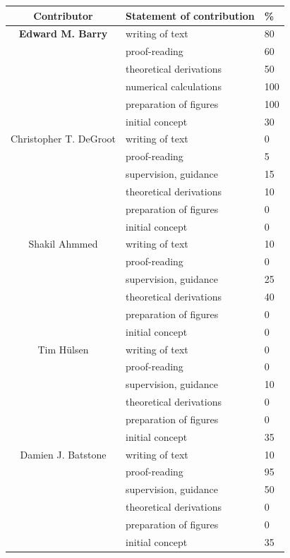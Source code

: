 \cleartoevenpage
\pagestyle{empty}	%


\begin{table}[h]
	\begin{center}
	\begin{tabular}{|c|l|l|}
		\hline
		Contributor & Statement of contribution & \% \\
		\hline
		\textbf{Edward M. Barry}	    & writing of text 			& 80\\
										& proof-reading				& 60 \\
										& theoretical derivations 	& 50 \\
										& numerical calculations 	& 100\\
										& preparation of figures 	& 100 \\
										& initial concept			& 30 \\
		\hline
		Christopher T. DeGroot			& writing of text 			& 0\\
										& proof-reading				& 5 \\
										& supervision, guidance 	& 15\\
										& theoretical derivations 	& 10\\
										& preparation of figures 	& 0 \\
										& initial concept			& 0 \\
		\hline
		Shakil Ahmmed       			& writing of text 			& 10\\
										& proof-reading				& 0 \\
										& supervision, guidance 	& 25\\
										& theoretical derivations 	& 40\\
										& preparation of figures 	& 0 \\
										& initial concept			& 0 \\
		\hline
		Tim H\"{u}lsen		    		& writing of text 			& 0 \\
										& proof-reading				& 0 \\
										& supervision, guidance 	& 10 \\
										& theoretical derivations 	& 0 \\
										& preparation of figures 	& 0 \\
										& initial concept			& 35 \\
		\hline
		Damien J. Batstone	    		& writing of text 			& 10\\
										& proof-reading				& 95 \\
										& supervision, guidance 	& 50 \\
										& theoretical derivations 	& 0 \\
										& preparation of figures 	& 0 \\
										& initial concept			& 35 \\
		\hline
	\end{tabular}
	\end{center}
\end{table}


